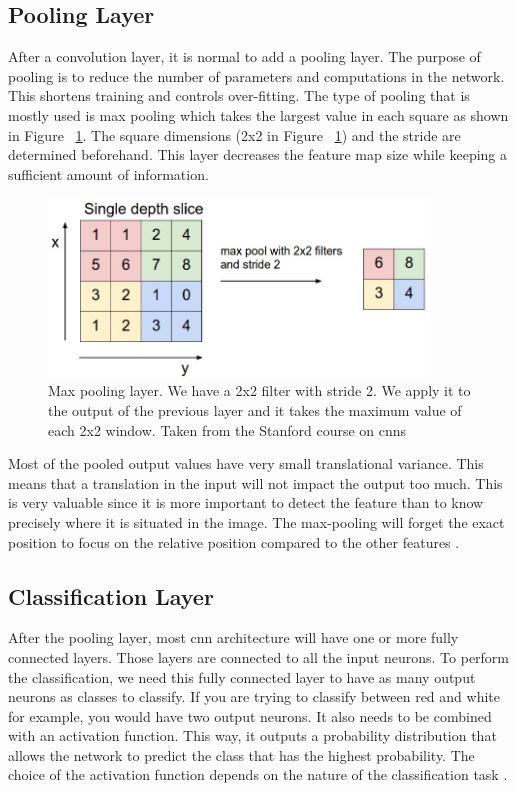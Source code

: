 \subsection{Pooling Layer}
After a convolution layer, it is normal to add a pooling layer. The purpose of pooling is to reduce the number of parameters and computations in the network. This shortens training and controls \gls{over-fitting}.
The type of pooling that is mostly used is max pooling which takes the largest value in each square as shown in Figure ~\ref{fig:maxpool}. The square dimensions (2x2 in Figure ~\ref{fig:maxpool})  and the stride are determined beforehand. This layer decreases the feature map size while keeping a sufficient amount of information. 
	\begin{figure}[!htp]
    \centering
        \includegraphics[width=0.9\textwidth]{figures/02-maxpool}
        \caption[Max Pooling layer]{Max pooling layer. We have a 2x2 filter with stride 2. We apply it to the output of the previous layer and it takes the maximum value of each 2x2 window. Taken from the Stanford course on \gls{cnn}s \cite{cs231n}}\label{fig:maxpool}
    \end{figure}
 
   
Most of the pooled output values have very small translational variance. This means that a translation in the input will not impact the output too much. This is very valuable since it is more important to detect the feature than to know precisely where it is situated in the image. The max-pooling will forget the exact position to focus on the relative position compared to the other features \cite{cs231n}.

\subsection{Classification Layer}
\label{sec:class_lay}
After the pooling layer, most \gls{cnn} architecture will have one or more fully connected layers. Those layers are connected to all the input neurons. To perform the classification, we need this fully connected layer to have as many output neurons as classes to classify. If you are trying to classify between red and white for example, you would have two output neurons.  It also needs to be combined with an activation function. This way, it outputs a probability distribution that allows the network to predict the class that has the highest probability. The choice of the activation function depends on the nature of the classification task \cite{deepbook}.
